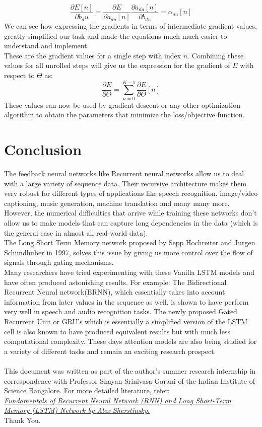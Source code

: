 \documentclass[12pt,letterpaper]{article}
\begin{document}
\[ 
\frac{\partial{E[n]}}{\partial{{b_du}}} = \frac{\partial{E}}{\partial{a_{du}[n]}}\frac{\partial{a_{du}[n]}}{\partial{b_{du}}} = \alpha_{du}[n] \tag{78}
\]
We can see how expressing the gradients in terms of intermediate gradient values, greatly simplified our task and made the equations much much easier to understand and implement. 
\\
These are the gradient values for a single step with index $n$.
Combining these values for all unrolled steps will give us the expression for the gradient of $E$ with respect to $\Theta$ as:
\[
\frac{\partial{E}}{\partial{\Theta}} = \sum_{n=0}^{K-1}\frac{\partial{E}}{\partial{\Theta}}[n]\tag{79}
\]
These values can now be used by gradient descent or any other optimization algorithm to obtain the parameters that minimize the loss/objective function.
\section{Conclusion}
The feedback neural networks like Recurrent neural networks allow us to deal with a large variety of sequence data. Their recursive architecture makes them very robust for different types of applications like speech recognition, image/video captioning, music generation, machine translation and many many more. However, the numerical difficulties that arrive while training these networks don't allow us to make models that can capture long dependencies in the data (which is the general case in almost all real-world data).
\\
The Long Short Term Memory network proposed by Sepp Hochreiter and Jurgen Schimdhuber in 1997, solves this issue by giving us more control over the flow of signals through gating mechanisms.\\
Many researchers have tried experimenting with these Vanilla LSTM models and have often produced astonishing results.
For example: The Bidirectional Recurrent Neural network(BRNN), which essentially takes into account information from later values in the sequence as well, is shown to have perform very well in speech and audio recognition tasks. 
The newly proposed Gated Recurrent Unit or GRU's which is essentially a simplified version of the LSTM cell is also known to have produced equivalent results but with much less computational complexity. These days attention models are also being studied for a variety of different tasks and remain an exciting research prospect.
\\\\
This document was written as part of the author's summer research internship in correspondence with Professor Shayan Srinivasa Garani of the Indian Institute of Science Bangalore.
For more detailed literature, refer:\\
\textit{
\href{https://arxiv.org/pdf/1808.03314.pdf}{
Fundamentals of Recurrent Neural Network (RNN) and Long Short-Term Memory (LSTM) Network by Alex Sherstinsky.}}
\\
Thank You.
\end{document}
